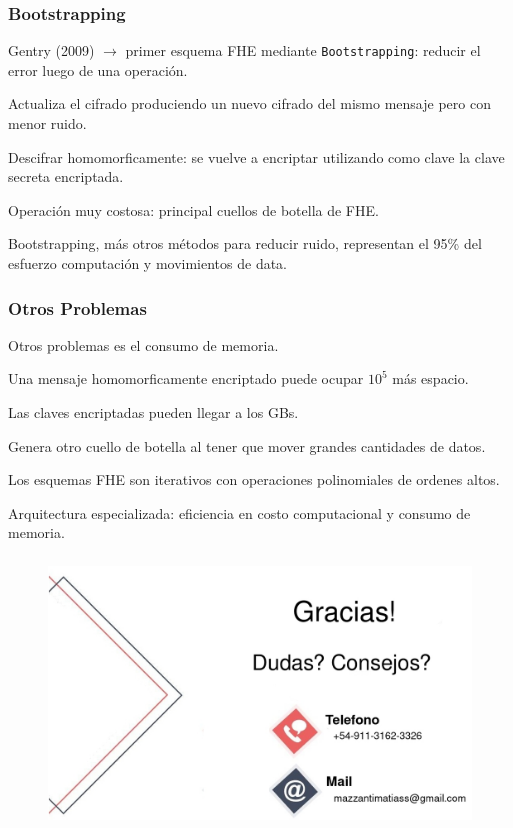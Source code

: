 \documentclass[handout]{beamer}
\begin{document}
\begin{frame}
\frametitle{Bootstrapping}
Gentry (2009) $\to$ primer  esquema FHE mediante \texttt{Bootstrapping}: reducir el error luego de una operación.

Actualiza el cifrado produciendo un nuevo cifrado del mismo mensaje pero con menor ruido.

Descifrar homomorficamente: se vuelve a encriptar utilizando como clave la clave secreta encriptada.

Operación muy costosa: principal cuellos de botella de FHE.



\begin{mdframed}[backgroundcolor=frenchblue!20]
  Bootstrapping, más otros métodos para reducir ruido, representan el 95\% del esfuerzo computación y movimientos de data.
\end{mdframed}
\end{frame}

\begin{frame}
\frametitle{Otros Problemas}

Otros problemas es el consumo de memoria.

Una mensaje homomorficamente encriptado puede ocupar $10^5$ más espacio.

Las claves encriptadas pueden llegar a los GBs.

Genera otro cuello de botella al tener que mover grandes cantidades de datos.

Los esquemas FHE son iterativos con operaciones polinomiales de ordenes altos.

\begin{mdframed}[backgroundcolor=frenchblue!20]
  Arquitectura especializada: eficiencia en costo computacional y consumo de memoria.
\end{mdframed}

\end{frame}

\begin{frame}
\frametitle{}
  \begin{figure}[h!]
      \centering
      \includegraphics[scale=0.3]{agradecimientos.jpg}
  \end{figure}
\end{frame}
\end{document}
